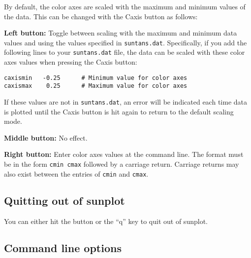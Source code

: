 By default, the color axes are scaled with the maximum and minimum values of the data.
This can be changed with the Caxis button as follows:
\begin{list}{}
\item {}
\begin{list}{}
\item {\bf Left button:} Toggle between scaling with the maximum and minimum data values and
using the values specified in \verb+suntans.dat+.  Specifically, if you add the following
lines to your \verb+suntans.dat+ file, the data can be scaled with these color axes values
when pressing the Caxis button:
\begin{verbatim}
caxismin   -0.25      # Minimum value for color axes
caxismax    0.25      # Maximum value for color axes
\end{verbatim}
If these values are not in \verb+suntans.dat+, an error will be indicated each time data
is plotted until the Caxis button is hit again to return to the default scaling mode.
\item {\bf Middle button:} No effect.
\item {\bf Right button:}  Enter color axes values at the command line.  The format must be
in the form \verb+cmin cmax+ followed by a carriage return.  Carriage returns may also
exist between the entries of \verb+cmin+ and \verb+cmax+.
\end{list}
\end{list}

\subsection{Quitting out of sunplot}

You can either hit the  button or the ``q'' key to quit out of sunplot.

\subsection{Command line options}

